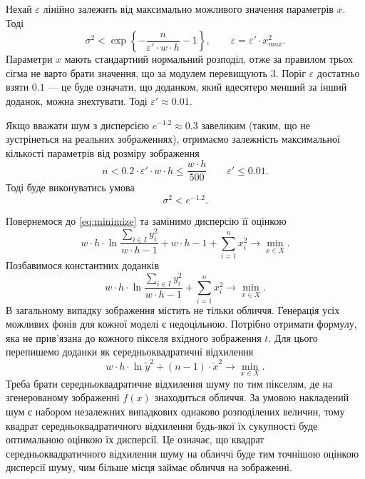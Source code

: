 Нехай $\varepsilon$ лінійно залежить від максимально можливого значення
параметрів $x$.
Тоді
\begin{equation*}
  \sigma^2
  < \exp{\left\{
      - \frac{n}{\varepsilon' \cdot w \cdot h}
      - 1
    \right\}},
    \qquad \varepsilon = \varepsilon' \cdot x_{max}^2.
\end{equation*}
Параметри $x$ мають стандартний нормальний розподіл,
отже за правилом трьох сігма не варто брати значення,
що за модулем перевищують 3.
Поріг $\varepsilon$ достатньо взяти $0.1$ ---
це буде означати, що доданком,
який вдесятеро менший за інший доданок,
можна знехтувати.
Тоді $\varepsilon' \approx 0.01$.

Якщо вважати шум з дисперсією $e^{-1.2} \approx 0.3$ завеликим
(таким, що не зустрінеться на реальних зображеннях),
отримаємо залежність максимальної кількості параметрів
від розміру зображення
\begin{equation}\label{eq:negligible_x}
  n
  < 0.2 \cdot \varepsilon' \cdot w \cdot h
  \le \frac{w \cdot h}{500}
  \qquad \varepsilon' \le 0.01.
\end{equation}
Тоді буде виконуватись умова
\begin{equation*}
  \sigma^2 < e^{-1.2}.
\end{equation*}

Повернемося до \eqref{eq:minimize} та замінимо дисперсію її оцінкою
\cite{BorovkovMS}
\begin{equation*}
  w \cdot h
  \cdot \ln{
    \frac{\sum\limits_{i \in I} y_i^2}
         {w \cdot h - 1}}
  + w \cdot h - 1
  + \sum_{i = 1}^n x_i^2
  \to \min\limits_{x \in X}.
\end{equation*}
Позбавимося константних доданків
\begin{equation*}
  w \cdot h
  \cdot \ln{
    \frac{\sum\limits_{i \in I} y_i^2}
         {w \cdot h - 1}}
  + \sum_{i = 1}^n x_i^2
  \to \min\limits_{x \in X}.
\end{equation*}
В загальному випадку зображення містить не тільки обличчя.
Генерація усіх можливих фонів для кожної моделі є недоцільною.
Потрібно отримати формулу,
яка не прив'язана до кожного пікселя вхідного зображення $t$.
Для цього перепишемо доданки як середньоквадратичні відхилення
\begin{equation*}
  w \cdot h
  \cdot \ln{\widetilde{y}^2}
  + \left( n - 1 \right) \cdot \widetilde{x}^2
  \to \min\limits_{x \in X}.
\end{equation*}
Треба брати середньоквадратичне відхилення шуму по тим пікселям,
де на згенерованому зображенні $f\left( x \right)$ знаходиться обличчя.
За умовою накладений шум є
набором незалежних випадкових однаково розподілених величин,
тому квадрат середньоквадратичного відхилення будь-якої їх сукупності
буде оптимальною оцінкою їх дисперсії.
Це означає, що квадрат середньоквадратичного відхилення шуму
на обличчі буде тим точнішою оцінкою дисперсії шуму,
чим більше місця займає обличчя на зображенні.

